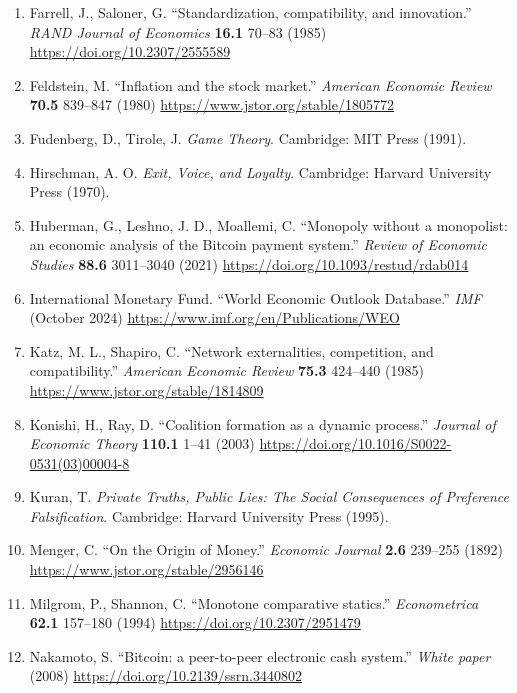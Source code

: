 \documentclass[12pt]{article}
\theoremstyle{definition}
\theoremstyle{remark}
\begin{document}
\begin{enumerate}[leftmargin=*,labelsep=0.5em,label=\arabic*.]
\item Farrell, J., Saloner, G. ``Standardization, compatibility,
and innovation.'' \emph{RAND Journal of Economics}
\textbf{16.1} 70--83 (1985) \url{https://doi.org/10.2307/2555589}

\item Feldstein, M. ``Inflation and the stock market.''
\emph{American Economic Review} \textbf{70.5} 839--847 (1980)
\url{https://www.jstor.org/stable/1805772}

\item Fudenberg, D., Tirole, J. \emph{Game Theory}. Cambridge:
MIT Press (1991).

\item Hirschman, A. O. \emph{Exit, Voice, and Loyalty}. Cambridge:
Harvard University Press (1970).

\item Huberman, G., Leshno, J. D., Moallemi, C. ``Monopoly without
a monopolist: an economic analysis of the Bitcoin payment
system.'' \emph{Review of Economic Studies} \textbf{88.6}
3011--3040 (2021) \url{https://doi.org/10.1093/restud/rdab014}

\item International Monetary Fund. ``World Economic Outlook
Database.'' \emph{IMF} (October 2024)
\url{https://www.imf.org/en/Publications/WEO}

\item Katz, M. L., Shapiro, C. ``Network externalities,
competition, and compatibility.'' \emph{American Economic
Review} \textbf{75.3} 424--440 (1985)
\url{https://www.jstor.org/stable/1814809}


\item Konishi, H., Ray, D. ``Coalition formation as a dynamic
process.'' \emph{Journal of Economic Theory} \textbf{110.1} 1--41
(2003) \url{https://doi.org/10.1016/S0022-0531(03)00004-8}

\item Kuran, T. \emph{Private Truths, Public Lies: The Social
Consequences of Preference Falsification}. Cambridge: Harvard
University Press (1995).

\item Menger, C. ``On the Origin of Money.'' \emph{Economic Journal}
\textbf{2.6} 239--255 (1892)
\url{https://www.jstor.org/stable/2956146}
\item Milgrom, P., Shannon, C. ``Monotone comparative statics.''
\emph{Econometrica} \textbf{62.1} 157--180 (1994)
\url{https://doi.org/10.2307/2951479}

\item Nakamoto, S. ``Bitcoin: a peer-to-peer electronic cash
system.'' \emph{White paper} (2008)
\url{https://doi.org/10.2139/ssrn.3440802}


\end{enumerate}
\end{document}

